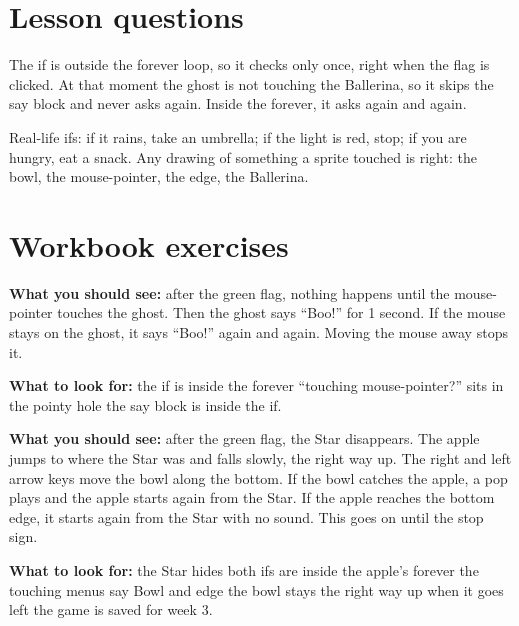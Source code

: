
\section{Lesson questions}
\begin{answer}
The if is outside the forever loop, so it checks only once, right when the flag is clicked. At that moment the ghost is not touching the Ballerina, so it skips the say block and never asks again. Inside the forever, it asks again and again.
\end{answer}

\begin{answer}[Reflection]
Real-life ifs: if it rains, take an umbrella; if the light is red, stop; if you are hungry, eat a snack. Any drawing of something a sprite touched is right: the bowl, the mouse-pointer, the edge, the Ballerina.
\end{answer}

\section{Workbook exercises}
\begin{answer}
\textbf{What you should see:} after the green flag, nothing happens until the mouse-pointer touches the ghost. Then the ghost says \enquote{Boo!} for 1 second. If the mouse stays on the ghost, it says \enquote{Boo!} again and again. Moving the mouse away stops it.

\textbf{What to look for:} \tickbox{} the if is inside the forever \quad \tickbox{} \enquote{touching mouse-pointer?} sits in the pointy hole \quad \tickbox{} the say block is inside the if.
\end{answer}

\begin{answer}
\textbf{What you should see:} after the green flag, the Star disappears. The apple jumps to where the Star was and falls slowly, the right way up. The right and left arrow keys move the bowl along the bottom. If the bowl catches the apple, a pop plays and the apple starts again from the Star. If the apple reaches the bottom edge, it starts again from the Star with no sound. This goes on until the stop sign.

\textbf{What to look for:} \tickbox{} the Star hides \quad \tickbox{} both ifs are inside the apple's forever \quad \tickbox{} the touching menus say Bowl and edge \quad \tickbox{} the bowl stays the right way up when it goes left \quad \tickbox{} the game is saved for week 3.
\end{answer}

